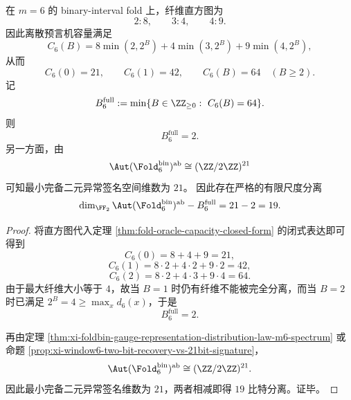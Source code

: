 \begin{proposition}\label{prop:conclusion-window6-19bit-separation}
在 \(m=6\) 的 binary-interval fold 上，纤维直方图为
\[
2:8,\qquad 3:4,\qquad 4:9.
\]
因此离散预言机容量满足
\[
C_6(B)=8\min(2,2^B)+4\min(3,2^B)+9\min(4,2^B),
\]
从而
\[
C_6(0)=21,\qquad C_6(1)=42,\qquad C_6(B)=64\quad(B\ge 2).
\]
记
\[
B^{\mathrm{full}}_6:=\min\{B\in\ZZ_{\ge 0}:\ C_6(B)=64\}.
\]
则
\[
B^{\mathrm{full}}_6=2.
\]
另一方面，由
\[
\Aut(\Fold_6^{\mathrm{bin}})^{\mathrm{ab}}\cong (\ZZ/2\ZZ)^{21}
\]
可知最小完备二元异常签名空间维数为 \(21\)。
因此存在严格的有限尺度分离
\[
\dim_{\FF_2}\Aut(\Fold_6^{\mathrm{bin}})^{\mathrm{ab}}-B^{\mathrm{full}}_6
=
21-2
=
19.
\]
\end{proposition}
\begin{proof}
将直方图代入定理 \ref{thm:fold-oracle-capacity-closed-form} 的闭式表达即可得到
\[
C_6(0)=8+4+9=21,
\]
\[
C_6(1)=8\cdot 2+4\cdot 2+9\cdot 2=42,
\]
\[
C_6(2)=8\cdot 2+4\cdot 3+9\cdot 4=64.
\]
由于最大纤维大小等于 \(4\)，故当 \(B=1\) 时仍有纤维不能被完全分离，而当 \(B=2\) 时已满足 \(2^B=4\ge \max_x d_6(x)\)，于是
\[
B^{\mathrm{full}}_6=2.
\]

再由定理 \ref{thm:xi-foldbin-gauge-representation-distribution-law-m6-spectrum} 或命题 \ref{prop:xi-window6-two-bit-recovery-vs-21bit-signature}，
\[
\Aut(\Fold_6^{\mathrm{bin}})^{\mathrm{ab}}\cong (\ZZ/2\ZZ)^{21}.
\]
因此最小完备二元异常签名维数为 \(21\)，两者相减即得 \(19\) 比特分离。证毕。
\end{proof}




\endinput
